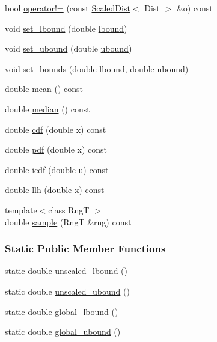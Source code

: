 \begin{DoxyCompactItemize}
\item 
bool \hyperlink{classprior__hessian_1_1ScaledDist_ada92f440acb5566f8e97f653f4da2015}{operator!=} (const \hyperlink{classprior__hessian_1_1ScaledDist}{Scaled\+Dist}$<$ Dist $>$ \&o) const 
\item 
void \hyperlink{classprior__hessian_1_1ScaledDist_a14964efa9531b9906d722a2d9fc52da3}{set\+\_\+lbound} (double \hyperlink{classprior__hessian_1_1ScaledDist_a46bce2de3c0e030e9e4542195ecb429f}{lbound})
\item 
void \hyperlink{classprior__hessian_1_1ScaledDist_ace5188e41adff598f3ed4d5dc8530af0}{set\+\_\+ubound} (double \hyperlink{classprior__hessian_1_1ScaledDist_a70c8013325f5b8709be0900dba6e9eda}{ubound})
\item 
void \hyperlink{classprior__hessian_1_1ScaledDist_a07e9dea370e56001f76ed8e10693f399}{set\+\_\+bounds} (double \hyperlink{classprior__hessian_1_1ScaledDist_a46bce2de3c0e030e9e4542195ecb429f}{lbound}, double \hyperlink{classprior__hessian_1_1ScaledDist_a70c8013325f5b8709be0900dba6e9eda}{ubound})
\item 
double \hyperlink{classprior__hessian_1_1ScaledDist_a3a821526d1d50027af00ef86663f9e68}{mean} () const 
\item 
double \hyperlink{classprior__hessian_1_1ScaledDist_a61f5160e1a6d2b2055596e14844975e0}{median} () const 
\item 
double \hyperlink{classprior__hessian_1_1ScaledDist_a58daada799ea4dd02ab3ea581751d04c}{cdf} (double x) const 
\item 
double \hyperlink{classprior__hessian_1_1ScaledDist_a9c2a6620b09c8f9dff9f712a628d9726}{pdf} (double x) const 
\item 
double \hyperlink{classprior__hessian_1_1ScaledDist_ac7b29b1849724c8e561a4cf01408d3f5}{icdf} (double u) const 
\item 
double \hyperlink{classprior__hessian_1_1ScaledDist_add647c73f1879a66f98bcce1b95dd215}{llh} (double x) const 
\item 
{\footnotesize template$<$class RngT $>$ }\\double \hyperlink{classprior__hessian_1_1ScaledDist_a7a5642c7d22a621f820c494b84abb259}{sample} (RngT \&rng) const 
\end{DoxyCompactItemize}
\subsubsection*{Static Public Member Functions}
\begin{DoxyCompactItemize}
\item 
static double \hyperlink{classprior__hessian_1_1ScaledDist_a364788705694bdd46cd5876e92e1ad87}{unscaled\+\_\+lbound} ()
\item 
static double \hyperlink{classprior__hessian_1_1ScaledDist_aa1aa0261a6a67d19016cdd99265bae8e}{unscaled\+\_\+ubound} ()
\item 
static double \hyperlink{classprior__hessian_1_1ScaledDist_a89328b784cf2f9ca7a4036361bf57fa3}{global\+\_\+lbound} ()
\item 
static double \hyperlink{classprior__hessian_1_1ScaledDist_aee92b7ba58d0037d39d28b3d45e7f777}{global\+\_\+ubound} ()
\end{DoxyCompactItemize}
